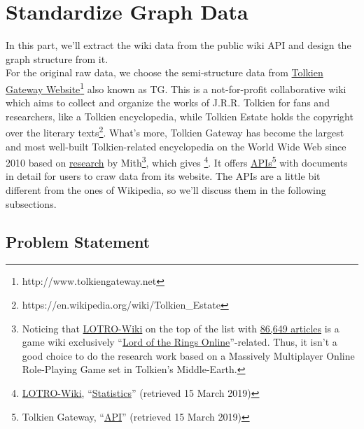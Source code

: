 \chapter{Standardize Graph Data}
\label{Ch-2:Sec:Standardize}

In this part, we'll extract the wiki data from the public wiki API and design the graph structure from it.\\
For the original raw data, we choose the semi-structure data from \href{http://www.tolkiengateway.net}{Tolkien Gateway Website}\footnote{http://www.tolkiengateway.net} also known as TG. This is a not-for-profit collaborative wiki which aims to collect and organize the works of J.R.R. Tolkien for fans and researchers, like a Tolkien encyclopedia, while Tolkien Estate holds the copyright over the literary texts\footnote{https://en.wikipedia.org/wiki/Tolkien\_Estate}. What's more, Tolkien Gateway has become the largest and most well-built Tolkien-related encyclopedia on the World Wide Web since 2010 based on \href{http://tolkiengateway.net/wiki/List\_of\_Tolkien\_Encyclopedias}{research} by Mith\footnote{Noticing that \href{https://lotro-wiki.com/}{LOTRO-Wiki} on the top of the list with \href{https://lotro-wiki.com/index.php/Special:Statistics}{86,649 articles} is a game wiki exclusively ``\href{https://lotro-wiki.com/index.php/Lord_of_the_Rings_Online}{Lord of the Rings Online}''-related. Thus, it isn't a good choice to do the research work based on a Massively Multiplayer Online Role-Playing Game set in Tolkien's Middle-Earth.}, which gives \footnote{\href{https://lotro-wiki.com/index.php/Lord\_of\_the\_Rings\_Online}{LOTRO-Wiki}, ``\href{https://lotro-wiki.com/index.php/Special:Statistics}{Statistics}'' (retrieved 15 March 2019)}. It offers \href{http://tolkiengateway.net/w/api.php}{APIs}\footnote{Tolkien Gateway, ``\href{http://tolkiengateway.net/w/api.php}{API}'' (retrieved 15 March 2019)} with documents in detail for users to craw data from its website. The APIs are a little bit different from the ones of Wikipedia, so we'll discuss them in the following subsections.

\section{Problem Statement}
\label{Ch-2:Sec:Problem Statement}

